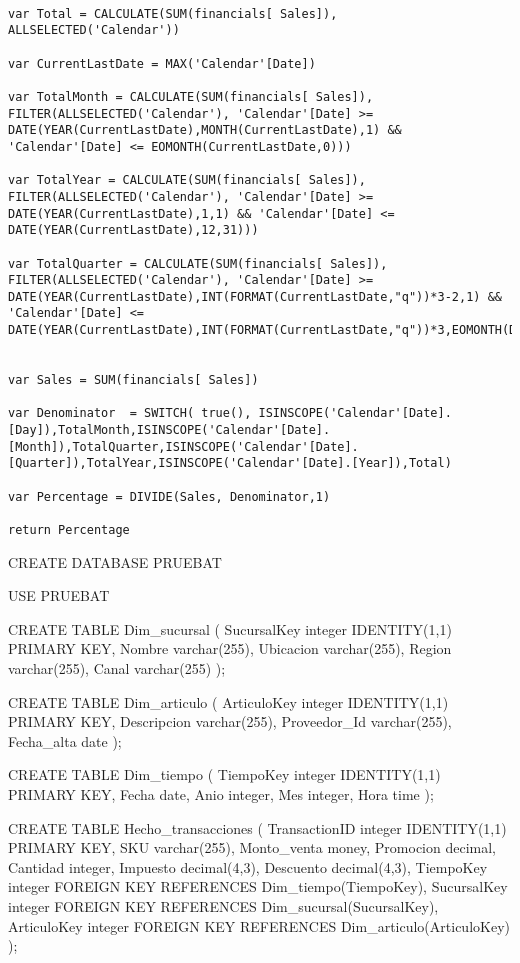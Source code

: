 \begin{lstlisting}[numbers=none]
% Percentage = 

var Total = CALCULATE(SUM(financials[ Sales]), ALLSELECTED('Calendar'))

var CurrentLastDate = MAX('Calendar'[Date])

var TotalMonth = CALCULATE(SUM(financials[ Sales]), FILTER(ALLSELECTED('Calendar'), 'Calendar'[Date] >= DATE(YEAR(CurrentLastDate),MONTH(CurrentLastDate),1) && 'Calendar'[Date] <= EOMONTH(CurrentLastDate,0)))

var TotalYear = CALCULATE(SUM(financials[ Sales]), FILTER(ALLSELECTED('Calendar'), 'Calendar'[Date] >= DATE(YEAR(CurrentLastDate),1,1) && 'Calendar'[Date] <=  DATE(YEAR(CurrentLastDate),12,31)))

var TotalQuarter = CALCULATE(SUM(financials[ Sales]), FILTER(ALLSELECTED('Calendar'), 'Calendar'[Date] >= DATE(YEAR(CurrentLastDate),INT(FORMAT(CurrentLastDate,"q"))*3-2,1) && 'Calendar'[Date] <=  DATE(YEAR(CurrentLastDate),INT(FORMAT(CurrentLastDate,"q"))*3,EOMONTH(DATE(YEAR(CurrentLastDate),INT(FORMAT(CurrentLastDate,"q"))*3,1),0))))


var Sales = SUM(financials[ Sales])

var Denominator  = SWITCH( true(), ISINSCOPE('Calendar'[Date].[Day]),TotalMonth,ISINSCOPE('Calendar'[Date].[Month]),TotalQuarter,ISINSCOPE('Calendar'[Date].[Quarter]),TotalYear,ISINSCOPE('Calendar'[Date].[Year]),Total)

var Percentage = DIVIDE(Sales, Denominator,1)

return Percentage
\end{lstlisting}



CREATE DATABASE PRUEBAT

USE PRUEBAT 

CREATE TABLE Dim_sucursal (
    SucursalKey integer IDENTITY(1,1) PRIMARY KEY,
	Nombre varchar(255),
	Ubicacion varchar(255),
	Region varchar(255),
	Canal varchar(255)
);

CREATE TABLE Dim_articulo (
    ArticuloKey integer IDENTITY(1,1) PRIMARY KEY,
	Descripcion varchar(255),
	Proveedor_Id varchar(255),
	Fecha_alta date	
);

CREATE TABLE Dim_tiempo (
    TiempoKey integer IDENTITY(1,1) PRIMARY KEY,
	Fecha date,
	Anio integer,
	Mes integer,
	Hora time
);


CREATE TABLE Hecho_transacciones (
    TransactionID integer IDENTITY(1,1) PRIMARY KEY,
	SKU varchar(255),
	Monto_venta money,
	Promocion decimal,
	Cantidad integer,
	Impuesto decimal(4,3),
	Descuento decimal(4,3),
	TiempoKey integer FOREIGN KEY REFERENCES Dim_tiempo(TiempoKey),
	SucursalKey integer FOREIGN KEY REFERENCES Dim_sucursal(SucursalKey),
	ArticuloKey integer FOREIGN KEY REFERENCES Dim_articulo(ArticuloKey)
);

